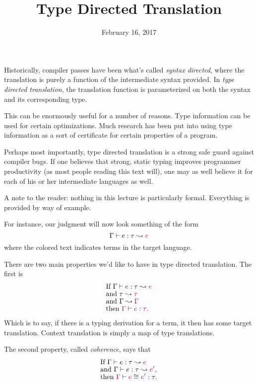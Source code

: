 \documentclass{article}
\title{Type Directed Translation}
\date{February 16, 2017}
\newcommand{\target}[1]{{\color{purple}#1}}
\begin{document}
\maketitle

Historically, compiler passes have been what's called \textit{syntax directed},
where the translation is purely a function of the intermediate syntax provided.
In \textit{type directed translation}, the translation function is
parameterized on both the syntax and its corresponding type.

This can be enormously useful for a number of reasons. Type information can be
used for certain optimizations. Much research has been put into using type
information as a sort of certificate for certain properties of a program.

Perhaps most importantly, type directed translation is a strong safe guard
against compiler bugs. If one believes that strong, static typing improves
programmer productivity (as most people reading this text will), one may as
well believe it for each of his or her intermediate languages as well.

A note to the reader: nothing in this lecture is particularly formal.
Everything is provided by way of example.

For instance, our judgment will now look something of the form
\[
\Gamma \vdash e:\tau \leadsto \target{e}
\]
where the \target{colored} text indicates terms in the target language.

There are two main properties we'd like to have in type directed translation.
The first is
\begin{align*}
&\text{If }\Gamma \vdash e : \tau \leadsto \target{e}\\[-1ex]
&\text{and }\tau \leadsto \target{\tau} \\[-1ex]
&\text{and }\Gamma \leadsto \target{\Gamma} \\[-1ex]
&\text{then }\target{\Gamma} \vdash \target{e} : \target{\tau}.
\end{align*}
Which is to say, if there is a typing derivation for a term, it then has some
target translation. Context translation is simply a map of type translations.

The second property, called \textit{coherence}, says that
\begin{align*}
&\text{If }\Gamma \vdash e : \tau \leadsto \target{e} \\[-1ex]
&  \text{and }\Gamma \vdash e : \tau \leadsto \target{e'}, \\[-1ex]
&  \text{then }\target{\Gamma} \vdash \target{e} \cong \target{e'} : \tau.
\end{align*}
\end{document}
